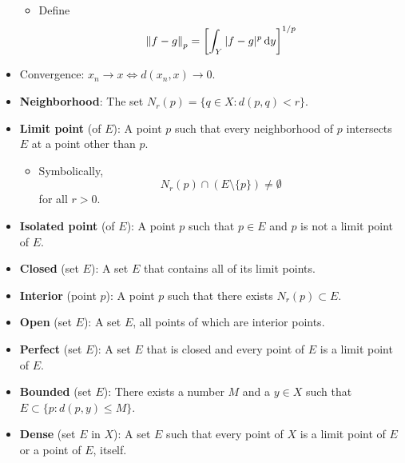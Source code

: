 \documentclass[../../notes.tex]{subfiles}
\begin{document}
\begin{itemize}
\begin{itemize}
        \item Define
        \begin{equation*}
            \norm{f-g}_p = \left[ \int_Y|f-g|^p\dd{y} \right]^{1/p}
        \end{equation*}
    \end{itemize}
    \item Convergence: $x_n\to x\Longleftrightarrow d(x_n,x)\to 0$.
    \item \textbf{Neighborhood}: The set $N_r(p)=\{q\in X:d(p,q)<r\}$.
    \item \textbf{Limit point} (of $E$): A point $p$ such that every neighborhood of $p$ intersects $E$ at a point other than $p$.
    \begin{itemize}
        \item Symbolically,
        \begin{equation*}
            N_r(p)\cap(E\setminus\{p\}) \neq \emptyset
        \end{equation*}
        for all $r>0$.
    \end{itemize}
    \item \textbf{Isolated point} (of $E$): A point $p$ such that $p\in E$ and $p$ is not a limit point of $E$.
    \item \textbf{Closed} (set $E$): A set $E$ that contains all of its limit points.
    \item \textbf{Interior} (point $p$): A point $p$ such that there exists $N_r(p)\subset E$.
    \item \textbf{Open} (set $E$): A set $E$, all points of which are interior points.
    \item \textbf{Perfect} (set $E$): A set $E$ that is closed and every point of $E$ is a limit point of $E$.
    \item \textbf{Bounded} (set $E$): There exists a number $M$ and a $y\in X$ such that $E\subset\{p:d(p,y)\leq M\}$.
    \item \textbf{Dense} (set $E$ in $X$): A set $E$ such that every point of $X$ is a limit point of $E$ or a point of $E$, itself.
\end{itemize}
\end{document}
